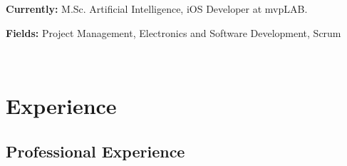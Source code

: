 \documentclass[a4paper,nocolors]{cv-friggeri-x}
\begin{document}
\textbf{Currently:} M.Sc. Artificial Intelligence, iOS Developer at mvpLAB.

\textbf{Fields:} Project Management, Electronics and Software Development, Scrum

\\

\section{Experience}

\subsection{Professional Experience}
\end{document}
